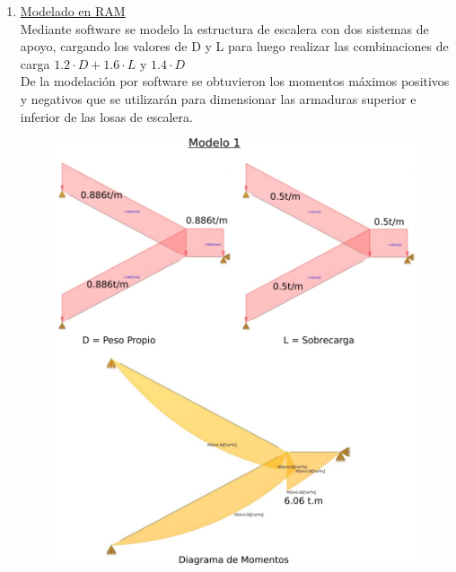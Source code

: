 \begin{enumerate}
\item \underline{Modelado en RAM}\\
Mediante software se modelo la estructura de escalera con dos sistemas de apoyo, cargando los valores de D y L para luego realizar las combinaciones de carga $1.2 \cdot D + 1.6 \cdot L$ y $1.4 \cdot D$\\
De la modelación por software se obtuvieron los momentos máximos positivos y negativos que se utilizarán para dimensionar las armaduras superior e inferior de las losas de escalera.\\
\begin{figure}[H]
\begin{center}
     \includegraphics[scale = 4.2]{chapters/chapter_2/images/modelo1.png}
\end{center}
\end{figure}
\begin{figure}[H]
\begin{center}

\end{center}
\end{figure}
\end{enumerate}

